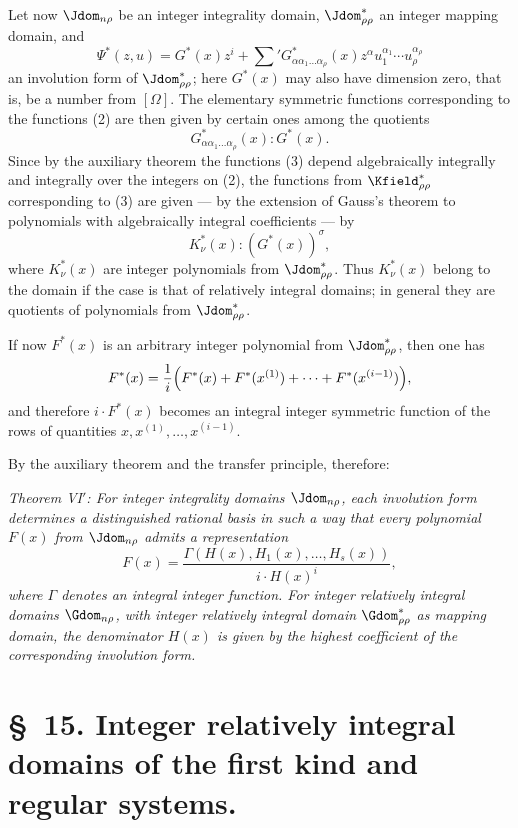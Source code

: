 \documentclass[11pt]{article}
\begin{document}
Let now $\Jdom_{n\rho}$ be an integer integrality domain, $\Jdom^*_{\rho\rho}$ an integer mapping domain, and
\[
  \Psi^*(z,u)=G^*(x)z^i+
  \sum{}'G^*_{\alpha\alpha_1\ldots\alpha_\rho}(x)
  z^\alpha u_1^{\alpha_1}\cdots u_\rho^{\alpha_\rho}
\]
an involution form of $\Jdom^*_{\rho\rho}$; here $G^*(x)$ may also have dimension zero, that is, be a number from $[\Omega]$. The elementary symmetric functions corresponding to the functions (2) are then given by certain ones among the quotients
\begin{equation}
  G^*_{\alpha\alpha_1\ldots\alpha_\rho}(x):G^*(x).
\tag{4}
\end{equation}
Since by the auxiliary theorem the functions (3) depend algebraically integrally and integrally over the integers on (2), the functions from $\Kfield^*_{\rho\rho}$ corresponding to (3) are given --- by the extension of Gauss's theorem to polynomials with algebraically integral coefficients --- by
\begin{equation}
  K_\nu^*(x):(G^*(x))^\sigma,
\tag{5}
\end{equation}
where $K_\nu^*(x)$ are integer polynomials from $\Jdom^*_{\rho\rho}$. Thus $K_\nu^*(x)$ belong to the domain if the case is that of relatively integral domains; in general they are quotients of polynomials from $\Jdom^*_{\rho\rho}$.

If now $F^*(x)$ is an arbitrary integer polynomial from $\Jdom^*_{\rho\rho}$, then one has
\[
  F^*(x)=\frac1i\Bigl(F^*(x)+F^*(x^{(1)})+\cdots+F^*(x^{(i-1)})\Bigr),
\]
and therefore $i\cdot F^*(x)$ becomes an integral integer symmetric function of the rows of quantities $x,x^{(1)},\ldots,x^{(i-1)}$.

By the auxiliary theorem and the transfer principle, therefore:

\emph{Theorem VI$'$: For integer integrality domains $\Jdom_{n\rho}$, each involution form determines a distinguished rational basis in such a way that every polynomial $F(x)$ from $\Jdom_{n\rho}$ admits a representation}
\[
  F(x)=\frac{\Gamma(H(x),H_1(x),\ldots,H_s(x))}{i\cdot H(x)^i},
\]
\emph{where $\Gamma$ denotes an integral integer function. For integer relatively integral domains $\Gdom_{n\rho}$, with integer relatively integral domain $\Gdom^*_{\rho\rho}$ as mapping domain, the denominator $H(x)$ is given by the highest coefficient of the corresponding involution form.}

\section*{\S\ 15. Integer relatively integral domains of the first kind and regular systems.}
\end{document}
